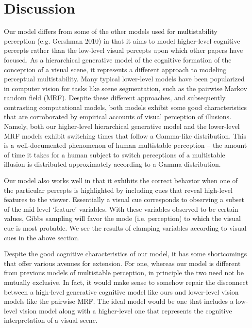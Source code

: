 \documentclass{article} %
\begin{document}
\section{Discussion}
Our model differs from some of the other models used for multistability perception (e.g. Gershman 2010) in that it aims to model higher-level cognitive percepts rather than the low-level visual percepts upon which other papers have focused. As a hierarchical generative model of the cognitive formation of the conception of a visual scene, it represents a different approach to modeling perceptual multistability. Many typical lower-level models have been popularized in computer vision for tasks like scene segmentation, such as the pairwise Markov random field (MRF). Despite these different approaches, and subsequently contrasting computational models, both models exhibit some good characteristics that are corroborated by empirical accounts of visual perception of illusions. Namely, both our higher-level hierarchical generative model and the lower-level MRF models exhibit switching times that follow a Gamma-like distribution. This is a well-documented phenomenon of human multistable perception – the amount of time it takes for a human subject to switch perceptions of a multistable illusion is distributed approximately according to a Gamma distribution.

Our model also works well in that it exhibits the correct behavior when one of the particular percepts is highlighted by including cues that reveal high-level features to the viewer. Essentially a visual cue corresponds to observing a subset of the mid-level ‘feature’ variables. With these variables observed to be certain values, Gibbs sampling will favor the mode (i.e. perception) to which the visual cue is most probable. We see the results of clamping variables according to visual cues in the above section.

Despite the good cognitive characteristics of our model, it has some shortcomings that offer various avenues for extension. For one, whereas our model is different from previous models of multistable perception, in principle the two need not be mutually exclusive. In fact, it would make sense to somehow repair the disconnect between a high-level generative cognitive model like ours and lower-level vision models like the pairwise MRF. The ideal model would be one that includes a low-level vision model along with a higher-level one that represents the cognitive interpretation of a visual scene.
\end{document}
